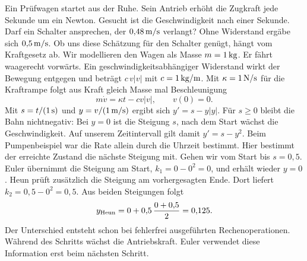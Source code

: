 Ein Prüfwagen startet aus der Ruhe. Sein Antrieb erhöht die Zugkraft jede Sekunde um ein Newton. Gesucht ist die Geschwindigkeit nach einer Sekunde. Darf ein Schalter ansprechen, der \(0{,}48\,\mathrm{m/s}\) verlangt? Ohne Widerstand ergäbe sich \(0{,}5\,\mathrm{m/s}\). Ob uns diese Schätzung für den Schalter genügt, hängt vom Kraftgesetz ab.
Wir modellieren den Wagen als Masse \(m=1\,\mathrm{kg}\). Er fährt waagerecht vorwärts. Ein geschwindigkeitsabhängiger Widerstand wirkt der Bewegung entgegen und beträgt \(c\,v|v|\) mit \(c=1\,\mathrm{kg/m}\). Mit \(\kappa=1\,\mathrm{N/s}\) für die Kraftrampe folgt aus Kraft gleich Masse mal Beschleunigung
\[
 m\dot v=\kappa t-cv|v|,\qquad v(0)=0.
\]
Mit \(s=t/(1\,\mathrm{s})\) und \(y=v/(1\,\mathrm{m/s})\) ergibt sich \(y'=s-y|y|\). Für \(s\ge0\) bleibt die Bahn nichtnegativ: Bei \(y=0\) ist die Steigung \(s\), nach dem Start wächst die Geschwindigkeit. Auf unserem Zeitintervall gilt damit \(y'=s-y^2\). Beim Pumpenbeispiel war die Rate allein durch die Uhrzeit bestimmt. Hier bestimmt der erreichte Zustand die nächste Steigung mit.
Gehen wir vom Start bis \(s=0{,}5\). Euler übernimmt die Steigung am Start, \(k_1=0-0^2=0\), und erhält wieder \(y=0\). Heun prüft zusätzlich die Steigung am vorhergesagten Ende. Dort liefert \(k_2=0{,}5-0^2=0{,}5\). Aus beiden Steigungen folgt
\[
 y_{\rm Heun}=0+0{,}5\,\frac{0+0{,}5}{2}=0{,}125.
\]
Der Unterschied entsteht schon bei fehlerfrei ausgeführten Rechenoperationen. Während des Schritts wächst die Antriebskraft. Euler verwendet diese Information erst beim nächsten Schritt.

